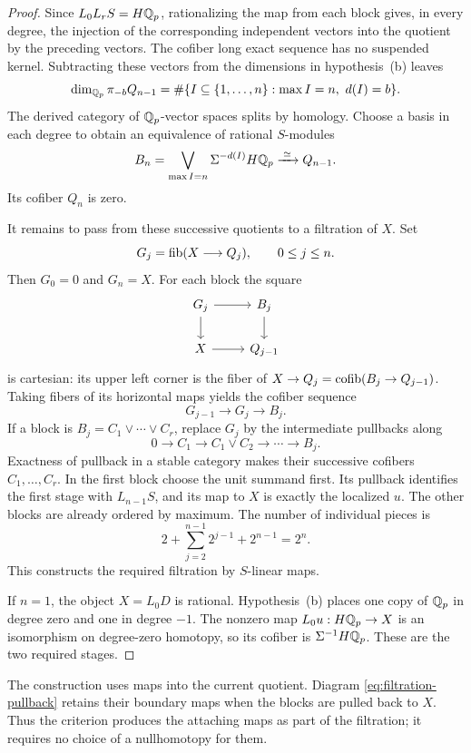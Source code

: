 \begin{proof}
Since \(L_0L_rS=H\mathbb Q_p\), rationalizing the map from each block
gives, in every degree, the injection of the corresponding
independent vectors into the quotient by the preceding vectors.
The cofiber long exact sequence has no suspended kernel. Subtracting
these vectors from the dimensions in hypothesis~(b) leaves
\[
\dim_{\mathbb Q_p}\pi_{-b}Q_{n-1}
=\#\{I\subseteq\{1,\ldots,n\}:\max I=n,\ d(I)=b\}.
\]
The derived category of \(\mathbb Q_p\)-vector spaces splits by homology.
Choose a basis in each degree to obtain an equivalence of
rational \(S\)-modules
\[
B_n=\bigvee_{\max I=n}\Sigma^{-d(I)}H\mathbb Q_p
 \xrightarrow{\;\simeq\;}Q_{n-1}.
\]
Its cofiber \(Q_n\) is zero.

It remains to pass from these successive quotients to a filtration
of \(X\). Set
\[
G_j=\operatorname{fib}(X\longrightarrow Q_j),\qquad 0\leq j\leq n.
\]
Then \(G_0=0\) and \(G_n=X\). For each block the square
\begin{equation}
\begin{tikzcd}
G_j \arrow[r] \arrow[d] & B_j \arrow[d]\\
X \arrow[r] & Q_{j-1}
\end{tikzcd}
\label{eq:filtration-pullback}
\end{equation}
is cartesian: its upper left corner is the fiber of
\(X\to Q_j=\operatorname{cofib}(B_j\to Q_{j-1})\). Taking fibers of its horizontal
maps yields the cofiber sequence
\[
G_{j-1}\longrightarrow G_j\longrightarrow B_j.
\]
If a block is \(B_j=C_1\vee\cdots\vee C_r\), replace \(G_j\) by
the intermediate pullbacks along
\[
0\longrightarrow C_1\longrightarrow C_1\vee C_2
\longrightarrow\cdots\longrightarrow B_j.
\]
Exactness of pullback in a stable category makes their successive
cofibers \(C_1,\ldots,C_r\). In the first block choose the unit
summand first. Its pullback identifies the first stage with
\(L_{n-1}S\), and its map to \(X\) is exactly the localized \(u\).
The other blocks are already ordered by maximum. The number of
individual pieces is
\[
2+\sum_{j=2}^{n-1}2^{j-1}+2^{n-1}=2^n.
\]
This constructs the required filtration by \(S\)-linear maps.

If \(n=1\), the object \(X=L_0D\) is rational. Hypothesis~(b)
places one copy of \(\mathbb Q_p\) in degree zero and one in degree
\(-1\). The nonzero map \(L_0u:H\mathbb Q_p\to X\) is an isomorphism on
degree-zero homotopy, so its cofiber is
\(\Sigma^{-1}H\mathbb Q_p\). These are the two required stages.
\end{proof}

\begin{remark}
\label{rem:assembly-extensions}
The construction uses maps into the current quotient. Diagram
\eqref{eq:filtration-pullback} retains their boundary maps when
the blocks are pulled back to \(X\). Thus the criterion produces
the attaching maps as part of the filtration; it requires no
choice of a nullhomotopy for them.
\end{remark}
